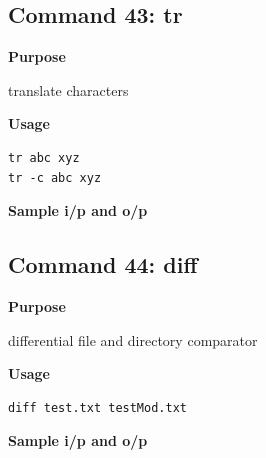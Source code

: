 \documentclass{article}
\begin{document}
\subsection{Command 43: tr} 
\textbf{Purpose}
\begin{flushleft}
 translate characters
\end{flushleft}
\textbf{Usage}
\begin{verbatim}
tr abc xyz
tr -c abc xyz
\end{verbatim}
\textbf{Sample i/p and o/p}
\begin{figure}[H] 
\end{figure}
\subsection{Command 44: diff} 
\textbf{Purpose}
\begin{flushleft}
 differential file and directory comparator
\end{flushleft}
\textbf{Usage}
\begin{verbatim}
diff test.txt testMod.txt
\end{verbatim}
\textbf{Sample i/p and o/p}
\begin{figure}[H] 
\end{figure}
\end{document}
